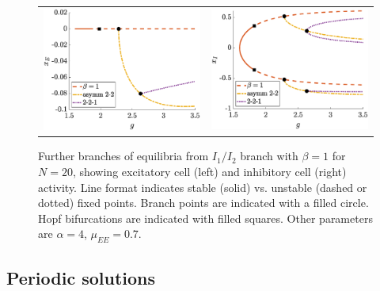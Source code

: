 \documentclass[reqno]{siamonline190516}
\begin{document}
\begin{figure}
    \centering
    \begin{tabular}{cc}
    \includegraphics[width=7.8cm]{N20beta1branchesE.eps} &
    \includegraphics[width=7.8cm]{N20beta1branchesI.eps}
    \end{tabular}
    \caption{Further branches of equilibria from $I_1/I_2$ branch with $\beta=1$ for $N=20$, showing excitatory cell (left) and inhibitory cell (right) activity. Line format indicates stable (solid) vs. unstable (dashed or dotted) fixed points. Branch points are indicated with a filled circle. Hopf bifurcations are indicated with filled squares. Other parameters are $\alpha = 4$, $\mu_{EE} = 0.7$.}
    \label{fig:noclusterbeta1branches}
\end{figure}

\subsection{Periodic solutions}\label{sec:periodic}
\end{document}
